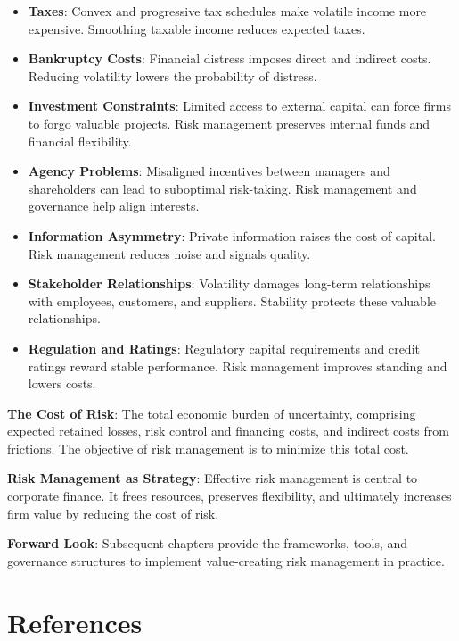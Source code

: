 \documentclass[11pt,openany]{book}
\providecommand{\tightlist}{\setlength{\itemsep}{0pt}\setlength{\parskip}{0pt}}
\begin{document}
\begin{keytakeaways}
  \begin{itemize}
  \tightlist
  \item
    \textbf{Taxes}: Convex and progressive tax schedules make volatile income more expensive. Smoothing taxable income reduces expected taxes.
  \item
    \textbf{Bankruptcy Costs}: Financial distress imposes direct and indirect costs. Reducing volatility lowers the probability of distress.
  \item
    \textbf{Investment Constraints}: Limited access to external capital can force firms to forgo valuable projects. Risk management preserves internal funds and financial flexibility.
  \item
    \textbf{Agency Problems}: Misaligned incentives between managers and shareholders can lead to suboptimal risk-taking. Risk management and governance help align interests.
  \item
    \textbf{Information Asymmetry}: Private information raises the cost of capital. Risk management reduces noise and signals quality.
  \item
    \textbf{Stakeholder Relationships}: Volatility damages long-term relationships with employees, customers, and suppliers. Stability protects these valuable relationships.
  \item
    \textbf{Regulation and Ratings}: Regulatory capital requirements and credit ratings reward stable performance. Risk management improves standing and lowers costs.
  \end{itemize}
\item
  \textbf{The Cost of Risk}: The total economic burden of uncertainty, comprising expected retained losses, risk control and financing costs, and indirect costs from frictions. The objective of risk management is to minimize this total cost.
\item
  \textbf{Risk Management as Strategy}: Effective risk management is central to corporate finance. It frees resources, preserves flexibility, and ultimately increases firm value by reducing the cost of risk.
\item
  \textbf{Forward Look}: Subsequent chapters provide the frameworks, tools, and governance structures to implement value-creating risk management in practice.
\end{keytakeaways}

\section*{References}
\begingroup
\sloppy
\end{document}
